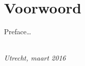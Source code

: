 \chapter*{Voorwoord}

Preface\ldots

\begin{flushright}
{\makeatletter\itshape
    \@author \\
    Utrecht, maart 2016
\makeatother}
\end{flushright}

